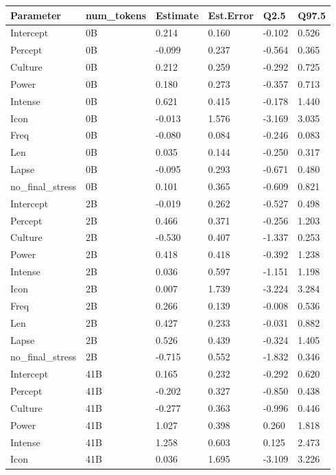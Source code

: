 \documentclass[
  nottoc]{article}
\begin{document}
\begin{longtable}[]{@{}llllll@{}}

\toprule\noalign{}
Parameter & num\_tokens & Estimate & Est.Error & Q2.5 & Q97.5 \\
\midrule\noalign{}
\endhead
\bottomrule\noalign{}
\endlastfoot
Intercept & 0B & 0.214 & 0.160 & -0.102 & 0.526 \\
Percept & 0B & -0.099 & 0.237 & -0.564 & 0.365 \\
Culture & 0B & 0.212 & 0.259 & -0.292 & 0.725 \\
Power & 0B & 0.180 & 0.273 & -0.357 & 0.713 \\
Intense & 0B & 0.621 & 0.415 & -0.178 & 1.440 \\
Icon & 0B & -0.013 & 1.576 & -3.169 & 3.035 \\
Freq & 0B & -0.080 & 0.084 & -0.246 & 0.083 \\
Len & 0B & 0.035 & 0.144 & -0.250 & 0.317 \\
Lapse & 0B & -0.095 & 0.293 & -0.671 & 0.480 \\
no\_final\_stress & 0B & 0.101 & 0.365 & -0.609 & 0.821 \\
Intercept & 2B & -0.019 & 0.262 & -0.527 & 0.498 \\
Percept & 2B & 0.466 & 0.371 & -0.256 & 1.203 \\
Culture & 2B & -0.530 & 0.407 & -1.337 & 0.253 \\
Power & 2B & 0.418 & 0.418 & -0.392 & 1.238 \\
Intense & 2B & 0.036 & 0.597 & -1.151 & 1.198 \\
Icon & 2B & 0.007 & 1.739 & -3.224 & 3.284 \\
Freq & 2B & 0.266 & 0.139 & -0.008 & 0.536 \\
Len & 2B & 0.427 & 0.233 & -0.031 & 0.882 \\
Lapse & 2B & 0.526 & 0.439 & -0.324 & 1.405 \\
no\_final\_stress & 2B & -0.715 & 0.552 & -1.832 & 0.346 \\
Intercept & 41B & 0.165 & 0.232 & -0.292 & 0.620 \\
Percept & 41B & -0.202 & 0.327 & -0.850 & 0.438 \\
Culture & 41B & -0.277 & 0.363 & -0.996 & 0.446 \\
Power & 41B & 1.027 & 0.398 & 0.260 & 1.818 \\
Intense & 41B & 1.258 & 0.603 & 0.125 & 2.473 \\
Icon & 41B & 0.036 & 1.695 & -3.109 & 3.226 \\

\end{longtable}
\end{document}
